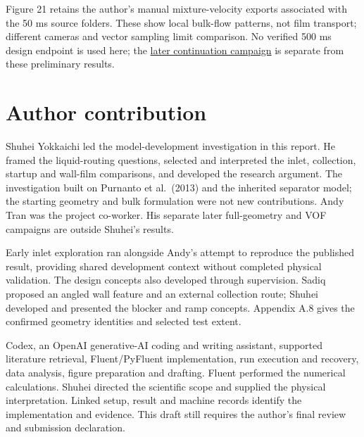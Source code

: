 \documentclass[12pt]{article}
\begin{document}
Figure 21 retains the author's manual mixture-velocity exports associated with the 50 ms source folders. These show local bulk-flow patterns, not film transport; different cameras and vector sampling limit comparison. No verified 500 ms design endpoint is used here; the \href{draft/../../../experiments/phase-10-proposed-design/server5-planv1-500ms.md}{later continuation campaign} is separate from these preliminary results.

\clearpage
\section{Author contribution}\label{appendix-b.-author-contribution}

Shuhei Yokkaichi led the model-development investigation in this report. He framed the liquid-routing questions, selected and interpreted the inlet, collection, startup and wall-film comparisons, and developed the research argument. The investigation built on Purnanto et al.~(2013) and the inherited separator model; the starting geometry and bulk formulation were not new contributions. Andy Tran was the project co-worker. His separate later full-geometry and VOF campaigns are outside Shuhei's results.

Early inlet exploration ran alongside Andy's attempt to reproduce the published result, providing shared development context without completed physical validation. The design concepts also developed through supervision. Sadiq proposed an angled wall feature and an external collection route; Shuhei developed and presented the blocker and ramp concepts. Appendix A.8 gives the confirmed geometry identities and selected test extent.

Codex, an OpenAI generative-AI coding and writing assistant, supported literature retrieval, Fluent/PyFluent implementation, run execution and recovery, data analysis, figure preparation and drafting. Fluent performed the numerical calculations. Shuhei directed the scientific scope and supplied the physical interpretation. Linked setup, result and machine records identify the implementation and evidence. This draft still requires the author's final review and submission declaration.
\end{document}

